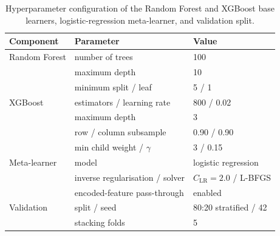 \documentclass{elektr}
\begin{document}
\begin{table}[H]
\centering
\caption{Hyperparameter configuration of the Random Forest and XGBoost base learners, logistic-regression meta-learner, and validation split.}
\label{tab:hyper}
\small
\begin{tabular}{lll}
\toprule
Component & Parameter & Value \\
\midrule
Random Forest & number of trees & 100 \\
 & maximum depth & 10 \\
 & minimum split / leaf & 5 / 1 \\
XGBoost & estimators / learning rate & 800 / 0.02 \\
 & maximum depth & 3 \\
 & row / column subsample & 0.90 / 0.90 \\
 & min child weight / $\gamma$ & 3 / 0.15 \\
Meta-learner & model & logistic regression \\
 & inverse regularisation / solver & $C_{\mathrm{LR}}=2.0$ / L-BFGS \\
 & encoded-feature pass-through & enabled \\
Validation & split / seed & 80:20 stratified / 42 \\
 & stacking folds & 5 \\
\bottomrule
\end{tabular}
\end{table}
\end{document}
